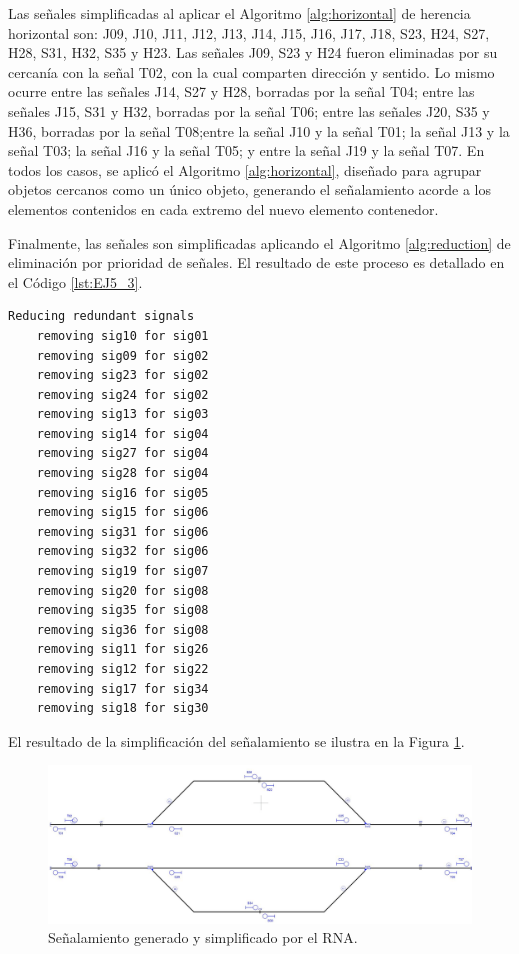 	Las señales simplificadas al aplicar el Algoritmo \ref{alg:horizontal} de herencia horizontal son: J09, J10, J11, J12, J13, J14, J15, J16, J17, J18, S23, H24, S27, H28, S31, H32, S35 y H23. Las señales J09, S23 y H24 fueron eliminadas por su cercanía con la señal T02, con la cual comparten dirección y sentido. Lo mismo ocurre entre las señales J14, S27 y H28, borradas por la señal T04; entre las señales J15, S31 y H32, borradas por la señal T06; entre las señales J20, S35 y H36, borradas por la señal T08;entre la señal J10 y la señal T01; la señal J13 y la señal T03; la señal J16 y la señal T05; y entre la señal J19 y la señal T07. En todos los casos, se aplicó el Algoritmo \ref{alg:horizontal}, diseñado para agrupar objetos cercanos como un único objeto, generando el señalamiento acorde a los elementos contenidos en cada extremo del nuevo elemento contenedor.
	
	Finalmente, las señales son simplificadas aplicando el Algoritmo \ref{alg:reduction} de eliminación por prioridad de señales. El resultado de este proceso es detallado en el Código \ref{lst:EJ5_3}.
	
	\begin{lstlisting}[language = {}, caption = Reducción de señalamiento por prioridad de señales, label = {lst:EJ5_3}]
	Reducing redundant signals
	removing sig10 for sig01
	removing sig09 for sig02
	removing sig23 for sig02
	removing sig24 for sig02
	removing sig13 for sig03
	removing sig14 for sig04
	removing sig27 for sig04
	removing sig28 for sig04
	removing sig16 for sig05
	removing sig15 for sig06
	removing sig31 for sig06
	removing sig32 for sig06
	removing sig19 for sig07
	removing sig20 for sig08
	removing sig35 for sig08
	removing sig36 for sig08
	removing sig11 for sig26
	removing sig12 for sig22
	removing sig17 for sig34
	removing sig18 for sig30
	\end{lstlisting}
	
	El resultado de la simplificación del señalamiento se ilustra en la Figura \ref{fig:EJ5_7}.
	
	\begin{figure}[H]
		\centering
		\includegraphics[width=1\textwidth]{resultados-obtenidos/ejemplo5/images/5_RNA.png}
		\centering\caption{Señalamiento generado y simplificado por el RNA.}
		\label{fig:EJ5_7}
	\end{figure}
	
